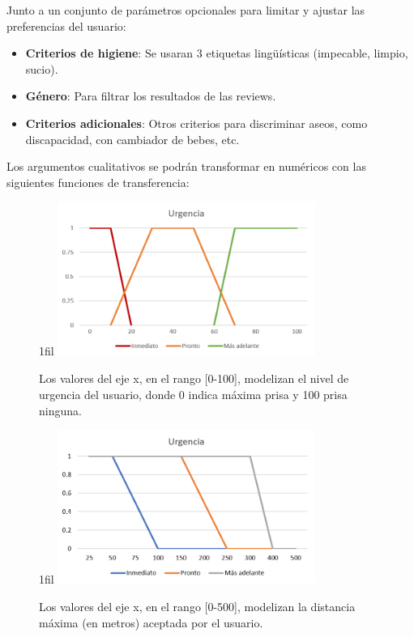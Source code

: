 \documentclass[13pt,a4paper]{article}
\makeatletter
\newcommand*{\centerfloat}{%
  \parindent \z@
  \leftskip \z@ \@plus 1fil \@minus \textwidth
  \rightskip\leftskip
  \parfillskip \z@skip}
\makeatother
\begin{document}
\newpage

Junto a un conjunto de parámetros opcionales para limitar y ajustar las preferencias del usuario:
\begin{itemize}
  \item \textbf{Criterios de higiene}: Se usaran 3 etiquetas lingüísticas (impecable, limpio, sucio).
  \item \textbf{Género}: Para filtrar los resultados de las reviews.
  \item \textbf{Criterios adicionales}: Otros criterios para discriminar aseos, como discapacidad, con cambiador de bebes, etc.
\end{itemize}

Los argumentos cualitativos se podrán transformar en numéricos con las siguientes funciones de transferencia:

\begin{figure}[H]
  \centerfloat
  \includegraphics[width=0.75\textwidth]{img/1.png}
  \caption{Los valores del eje x, en el rango [0-100], modelizan el nivel de urgencia del usuario, donde 0 indica máxima prisa y 100 prisa ninguna.}
  \label{urgencia}
\end{figure}

\begin{figure}[H]
  \centerfloat
  \includegraphics[width=0.75\textwidth]{img/2.png}
  \caption{Los valores del eje x, en el rango [0-500], modelizan la distancia máxima (en metros) aceptada por el usuario.}
  \label{distancia}
\end{figure}
\end{document}

